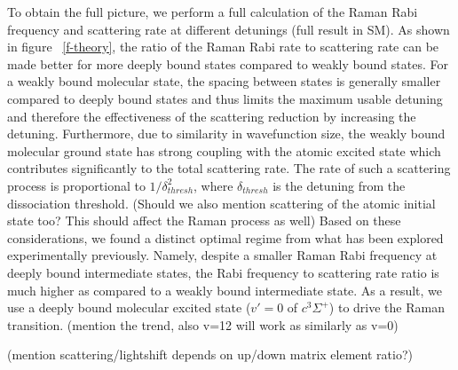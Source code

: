 \documentclass[aps,prl,twocolumn,groupedaddress]{revtex4-1}
\begin{document}
To obtain the full picture, we perform a full calculation of the Raman Rabi frequency and scattering rate at different detunings (full result in SM). As shown in figure ~\ref{f-theory}, the ratio of the Raman Rabi rate to scattering rate can be made better for more deeply bound states compared to weakly bound states. For a weakly bound molecular state, the spacing between states is generally smaller compared to deeply bound states and thus %
limits the maximum usable detuning and therefore the effectiveness of the scattering reduction by increasing the detuning. Furthermore, due to similarity in wavefunction size, the weakly bound molecular ground state has strong coupling with the atomic excited state which contributes significantly to the total scattering rate. The rate of such a scattering process is proportional to $1/\delta_{thresh}^2$,
where $\delta_{thresh}$ is the detuning from the dissociation threshold. (Should we also mention scattering of the atomic initial state too? This should affect the Raman process as well)
Based on these considerations, %
we found a distinct optimal regime from what has been explored experimentally previously. Namely, despite a smaller Raman Rabi frequency at deeply bound intermediate states, the Rabi frequency to scattering rate ratio is much higher as compared to a weakly bound intermediate state. As a result, we use a deeply bound molecular excited state ($v'=0$ of $c^3\Sigma^+$) to drive the Raman transition. (mention the trend, also v=12 will work as similarly as v=0)



(mention scattering/lightshift depends on up/down matrix element ratio?)
\end{document}

